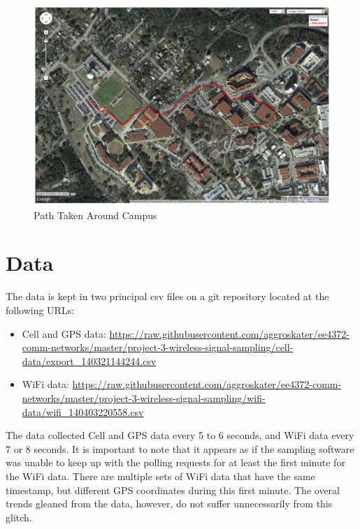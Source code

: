 \documentclass[journal,twocolumn]{IEEEtran}
\begin{document}
\begin{figure}
\begin{center}
\includegraphics[scale=0.4]{path-data/Path-Taken-Starting-At-Mitte.png}
\caption{Path Taken Around Campus}
\label{fig_path}
\end{center}
\end{figure}

\section{Data}

The data is kept in two principal csv files on a git repository located at 
the following URLs:

\begin{itemize}
\item
Cell and GPS data: \url{https://raw.githubusercontent.com/aggroskater/ee4372-comm-networks/master/project-3-wireless-signal-sampling/cell-data/export_140321144244.csv}
\item
WiFi data: \url{https://raw.githubusercontent.com/aggroskater/ee4372-comm-networks/master/project-3-wireless-signal-sampling/wifi-data/wifi_140403220558.csv}
\end{itemize}

The data collected Cell and GPS data every 5 to 6 seconds, and WiFi data every 
7 or 8 seconds. It is important to note that it appears as if the sampling 
software was unable to keep up with the polling requests for at least the 
first minute for the WiFi data. There are multiple sets of WiFi data that have
the same timestamp, but different GPS coordinates during this first minute. The
overal trends gleaned from the data, however, do not suffer unnecessarily from
this glitch.
\end{document}
